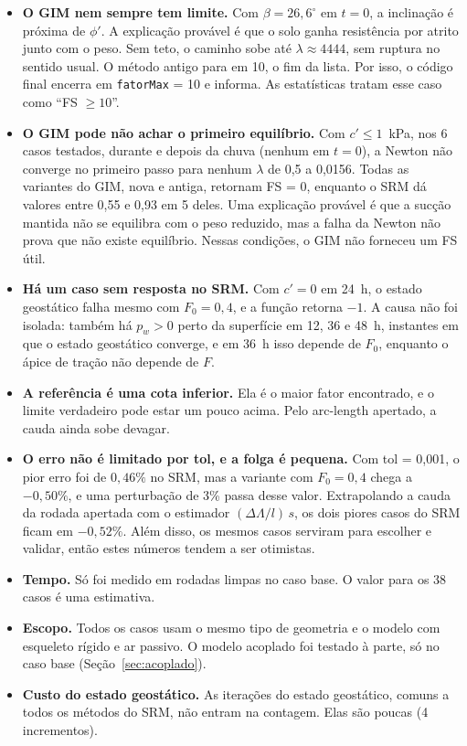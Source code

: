 \documentclass[11pt,a4paper]{article}
\numberwithin{equation}{section}
\begin{document}
\begin{itemize}
\item \textbf{O GIM nem sempre tem limite.} Com $\beta = 26{,}6^\circ$ em $t = 0$, a inclinação é próxima de $\phi'$. A explicação provável é que o solo ganha resistência por atrito junto com o peso. Sem teto, o caminho sobe até $\lambda \approx 4444$, sem ruptura no sentido usual. O método antigo para em 10, o fim da lista. Por isso, o código final encerra em \texttt{fatorMax} = 10 e informa. As estatísticas tratam esse caso como ``FS $\ge 10$''.
\item \textbf{O GIM pode não achar o primeiro equilíbrio.} Com $c' \le 1$~kPa, nos 6 casos testados, durante e depois da chuva (nenhum em $t = 0$), a Newton não converge no primeiro passo para nenhum $\lambda$ de 0,5 a 0,0156. Todas as variantes do GIM, nova e antiga, retornam FS = 0, enquanto o SRM dá valores entre 0,55 e 0,93 em 5 deles. Uma explicação provável é que a sucção mantida não se equilibra com o peso reduzido, mas a falha da Newton não prova que não existe equilíbrio. Nessas condições, o GIM não forneceu um FS útil.
\item \textbf{Há um caso sem resposta no SRM.} Com $c' = 0$ em 24~h, o estado geostático falha mesmo com $F_0 = 0{,}4$, e a função retorna $-1$. A causa não foi isolada: também há $p_w > 0$ perto da superfície em 12, 36 e 48~h, instantes em que o estado geostático converge, e em 36~h isso depende de $F_0$, enquanto o ápice de tração não depende de $F$.
\item \textbf{A referência é uma cota inferior.} Ela é o maior fator encontrado, e o limite verdadeiro pode estar um pouco acima. Pelo arc-length apertado, a cauda ainda sobe devagar.
\item \textbf{O erro não é limitado por tol, e a folga é pequena.} Com tol = 0,001, o pior erro foi de $0{,}46\%$ no SRM, mas a variante com $F_0 = 0{,}4$ chega a $-0{,}50\%$, e uma perturbação de 3\% passa desse valor. Extrapolando a cauda da rodada apertada com o estimador $(\Delta\Lambda/l)\,s$, os dois piores casos do SRM ficam em $-0{,}52\%$. Além disso, os mesmos casos serviram para escolher e validar, então estes números tendem a ser otimistas.
\item \textbf{Tempo.} Só foi medido em rodadas limpas no caso base. O valor para os 38 casos é uma estimativa.
\item \textbf{Escopo.} Todos os casos usam o mesmo tipo de geometria e o modelo com esqueleto rígido e ar passivo. O modelo acoplado foi testado à parte, só no caso base (Seção~\ref{sec:acoplado}).
\item \textbf{Custo do estado geostático.} As iterações do estado geostático, comuns a todos os métodos do SRM, não entram na contagem. Elas são poucas (4 incrementos).
\end{itemize}
\end{document}
